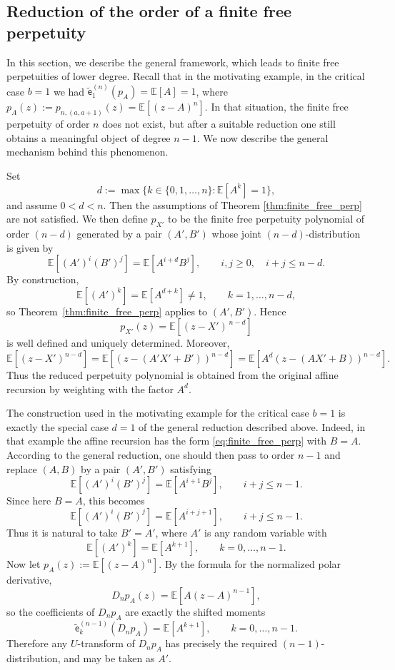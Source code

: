 \documentclass[a4paper,11pt]{amsart}
\numberwithin{equation}{section}
\newcommand{\E}{\mathbb{E}}
\newcommand{\coef}[2]{\widetilde{\mathsf{e}}_{#1}^{(#2)}} %
\begin{document}
\subsection{Reduction of the order of a finite free perpetuity}\label{sec:reduct}

In this section, we describe the general framework, which leads to finite free perpetuities of lower degree. Recall that in the motivating example, in the critical case \(b=1\) we had $\coef{1}{n}(p_A) = \E[A]=1$, where $p_A(z):=p_{n,(a,a+1)}(z)=\E[(z-A)^n]$. 
In that situation, the finite free perpetuity of order \(n\) does not exist, but after a suitable reduction one still obtains a meaningful object of degree \(n-1\). We now describe the general mechanism behind this phenomenon.

Set
\[
d:=\max\{k\in\{0,1,\dots,n\}\colon \E[A^k]= 1\},
\]
and assume \(0<d<n\). Then the assumptions of Theorem \ref{thm:finite_free_perp} are not satisfied. We then define \(p_{X'}\) to be the finite free perpetuity polynomial of order \((n-d)\) generated by a pair \((A',B')\) whose joint \((n-d)\)-distribution is given by
\[
\E[(A')^i(B')^j]=\E[A^{i+d}B^j],
\qquad i,j\ge 0,\quad i+j\le n-d.
\]
By construction,
\[
\E[(A')^k]=\E[A^{d+k}] \neq 1,
\qquad k=1,\dots,n-d,
\]
so Theorem~\ref{thm:finite_free_perp} applies to \((A',B')\). Hence
\[
p_{X'}(z)=\E[(z-X')^{\,n-d}]
\]
is well defined and uniquely determined.
Moreover,
\[
\E[(z-X')^{n-d}]
=\E[(z-(A'X'+B'))^{n-d}]
=\E\left[A^d(z-(AX'+B))^{n-d}\right].
\]
Thus the reduced perpetuity polynomial is obtained from the original affine recursion by weighting with the factor \(A^d\).



The construction used in the motivating example for the critical case \(b=1\) is exactly the special case \(d=1\) of the general reduction described above.
Indeed, in that example the affine recursion has the form \eqref{eq:finite_free_perp} with $B=A$. According to the general reduction, one should then pass to order \(n-1\) and replace \((A,B)\) by a pair \((A',B')\) satisfying
\[
\E[(A')^i(B')^j]=\E[A^{i+1}B^j],
\qquad i+j\le n-1.
\]
Since here \(B=A\), this becomes
\[
\E[(A')^i(B')^j]=\E[A^{i+j+1}],
\qquad i+j\le n-1.
\]
Thus it is natural to take \(B'=A'\), where \(A'\) is any random variable with
\[
\E[(A')^k]=\E[A^{k+1}],
\qquad k=0,\dots,n-1.
\]
Now let $p_A(z):=\E[(z-A)^n]$. By the formula for the normalized polar derivative,
\[
D_n p_A(z)=\E[A(z-A)^{n-1}],
\]
so the coefficients of \(D_n p_A\) are exactly the shifted moments
\[
\coef{k}{n-1}(D_n p_A)=\E[A^{k+1}], \qquad k=0,\dots,n-1.
\]
Therefore any \(U\)-transform of \(D_n p_A\) has precisely the required \((n-1)\)-distribution, and may be taken as \(A'\).
\end{document}
